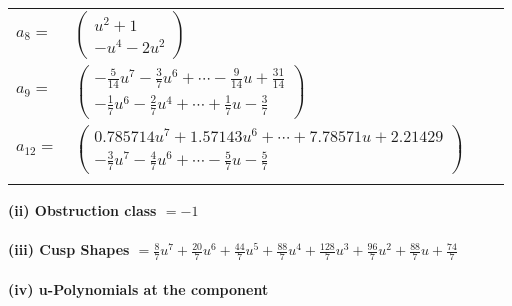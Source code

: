 \documentclass[1p]{elsarticle_modified}
\theoremstyle{definition}
\begin{document}
\begin{tabular}{m{7pt} m{180pt} m{7pt} m{180pt} }
\flushright $a_{8}=$&$\begin{pmatrix}u^2+1\\- u^4-2 u^2\end{pmatrix}$ \\
\flushright $a_{9}=$&$\begin{pmatrix}-\frac{5}{14} u^7-\frac{3}{7} u^6+\cdots-\frac{9}{14} u+\frac{31}{14}\\-\frac{1}{7} u^6-\frac{2}{7} u^4+\cdots+\frac{1}{7} u-\frac{3}{7}\end{pmatrix}$ \\
\flushright $a_{12}=$&$\begin{pmatrix}0.785714 u^{7}+1.57143 u^{6}+\cdots+7.78571 u+2.21429\\-\frac{3}{7} u^7-\frac{4}{7} u^6+\cdots-\frac{5}{7} u-\frac{5}{7}\end{pmatrix}$\\&\end{tabular}
\flushleft \textbf{(ii) Obstruction class $= -1$}\\~\\
\flushleft \textbf{(iii) Cusp Shapes $= \frac{8}{7} u^7+\frac{20}{7} u^6+\frac{44}{7} u^5+\frac{88}{7} u^4+\frac{128}{7} u^3+\frac{96}{7} u^2+\frac{88}{7} u+\frac{74}{7}$}\\~\\
\newpage\renewcommand{\arraystretch}{1}
\flushleft \textbf{(iv) u-Polynomials at the component}\newline \\
\end{document}
